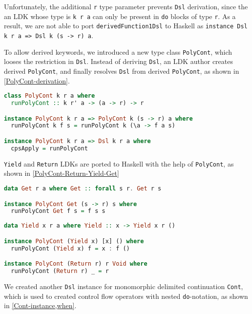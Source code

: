 Unfortunately, the additional \lstinline{r} type parameter prevents \lstinline{Dsl} derivation, since the an LDK whose type is \lstinline{k r a} can only be present in \lstinline{do} blocks of type \lstinline{r}. As a result, we are not able to port \lstinline{derivedFunction1Dsl} to Haskell as \lstinline{instance Dsl k r a => Dsl k (s -> r) a}.

To allow derived keywords, we introduced a new type class \lstinline{PolyCont}, which looses the restriction in \lstinline{Dsl}. Instead of deriving \lstinline{Dsl}, an LDK author creates derived \lstinline{PolyCont}, and finally resolves \lstinline{Dsl} from derived \lstinline{PolyCont}, as shown in \cref{PolyCont-derivation}.

\begin{lstlisting}[float=htbp,language={Haskell},caption={\lstinline{PolyCont} derivation},label={PolyCont-derivation}]
class PolyCont k r a where
  runPolyCont :: k r' a -> (a -> r) -> r

instance PolyCont k r a => PolyCont k (s -> r) a where
  runPolyCont k f s = runPolyCont k (\a -> f a s)

instance PolyCont k r a => Dsl k r a where
  cpsApply = runPolyCont
\end{lstlisting}

\lstinline{Yield} and \lstinline{Return} LDKs are ported to Haskell with the help of \lstinline{PolyCont}, as shown in \cref{PolyCont-Return-Yield-Get}

\begin{lstlisting}[float=htbp,language={Haskell},caption={\lstinline{PolyCont} instances for \lstinline{Get}, \lstinline{Yield} and \lstinline{Return}},label={PolyCont-Return-Yield-Get}]
data Get r a where Get :: forall s r. Get r s

instance PolyCont Get (s -> r) s where
  runPolyCont Get f s = f s s
  
data Yield x r a where Yield :: x -> Yield x r ()

instance PolyCont (Yield x) [x] () where
  runPolyCont (Yield x) f = x : f ()

instance PolyCont (Return r) r Void where
  runPolyCont (Return r) _ = r
\end{lstlisting}

We created another \lstinline{Dsl} instance for monomorphic delimited continuation \lstinline{Cont}, which is used to created control flow operators with nested \lstinline{do}-notation, as shown in \cref{Cont-instance,when}.

